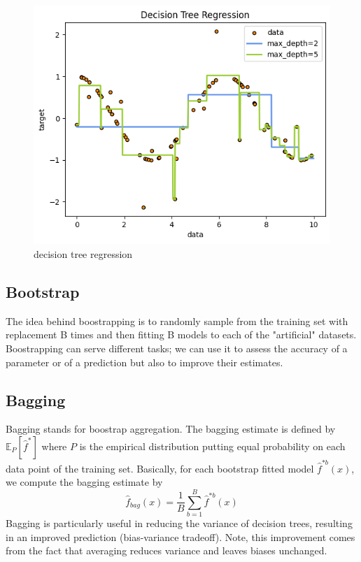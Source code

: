 \begin{figure}
    \includegraphics[width=\textwidth]{images/decision_tree.png}
    \caption{decision tree regression}
    \label{fig:decision_tree}
\end{figure}
    
\subsection{Bootstrap}
The idea behind boostrapping is to randomly sample from the training set with replacement B times and then fitting B models to each of the "artificial" datasets. Boostrapping can serve different tasks; we can use it to assess the accuracy of a parameter %
or of a prediction but also to improve their estimates.

\subsection{Bagging}
Bagging stands for boostrap aggregation. 
The bagging estimate is defined by $\mathbb{E}_P[\hat{f}^*]$ where $P$ is the empirical distribution putting equal probability on each data point of the training set.
Basically, for each bootstrap fitted model $\hat{f}^{*b}(x)$, we compute the bagging estimate by
\begin{equation}
    \hat{f}_{bag}(x)=\frac{1}{B}\sum\limits_{b=1}^{B}\hat{f}^{*b}(x)
\end{equation}
Bagging is particularly useful in reducing the variance of decision trees, resulting in an improved prediction (bias-variance tradeoff).
Note, this improvement comes from the fact that averaging reduces variance and leaves biases unchanged.

